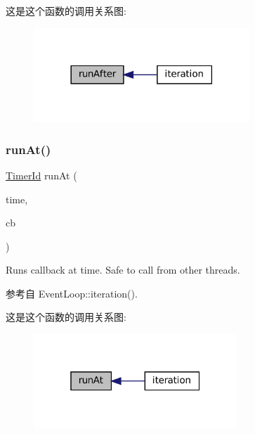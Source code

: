这是这个函数的调用关系图\+:
\nopagebreak
\begin{figure}[H]
\begin{center}
\leavevmode
\includegraphics[width=230pt]{classmuduo_1_1net_1_1EventLoop_af7e9c28bac049d58cc6a8e5040e1ddb2_icgraph}
\end{center}
\end{figure}
\mbox{\label{classmuduo_1_1net_1_1EventLoop_a4350dc8459b380bdd4341f3d91b69348}} 
\subsubsection{\texorpdfstring{run\+At()}{runAt()}}
{\footnotesize\ttfamily \hyperlink{classmuduo_1_1net_1_1TimerId}{Timer\+Id} run\+At (\begin{DoxyParamCaption}\item[{\hyperlink{classmuduo_1_1Timestamp}{Timestamp}}]{time,  }\item[{\hyperlink{namespacemuduo_1_1net_ad4bd8788fd4c609b90c78920572bec50}{Timer\+Callback}}]{cb }\end{DoxyParamCaption})}

Runs callback at \textquotesingle{}time\textquotesingle{}. Safe to call from other threads. 

参考自 Event\+Loop\+::iteration().

这是这个函数的调用关系图\+:
\nopagebreak
\begin{figure}[H]
\begin{center}
\leavevmode
\includegraphics[width=217pt]{classmuduo_1_1net_1_1EventLoop_a4350dc8459b380bdd4341f3d91b69348_icgraph}
\end{center}
\end{figure}
\mbox{\label{classmuduo_1_1net_1_1EventLoop_a356b0d632f1ffd8e4d352c78e30af891}} 
